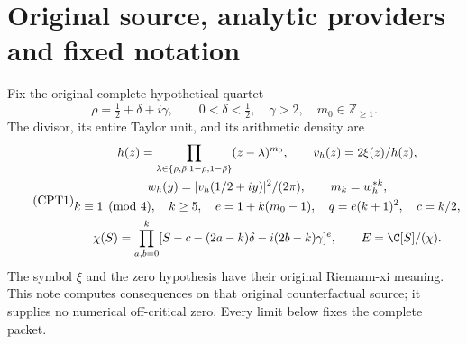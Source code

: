 \documentclass[11pt,a4paper]{article}
\begin{document}
\begin{abstract}
The full two-parameter arithmetic source interpolation has a uniformly
small central derivative on every specified complete annihilator
polynomial space.  Its explicit derivative bound is the product of the
original logarithmic density contrast and the central localization
fraction.  Integrating this derivative proves exponential relative
metric bounds and an explicit bound for the actual minimum sections.
For the complete relation ideal this gives a finite central-leg error
and a finite rectangle error in the original four-endpoint signed
determinant.  The remaining source-band interaction is expressed by its
exact two-variable reproducing-kernel integral.  Every statement retains
the full primary orders, original physical coordinate, original
polynomial remainder map, complete real integration domain and both
endpoint multiplicities.
\end{abstract}

\section{Original source, analytic providers and fixed notation}

Fix the original complete hypothetical quartet
\[
 \rho=\tfrac12+\delta+i\gamma,\qquad
 0<\delta<\tfrac12,\quad\gamma>2,\quad m_0\in\mathbb Z_{\ge1}.
\]
The divisor, its entire Taylor unit, and its arithmetic density are
\begin{equation}\tag{CPT1}
\begin{gathered}
 h(z)=\prod_{\lambda\in\{\rho,\bar\rho,1-\rho,1-\bar\rho\}}
             (z-\lambda)^{m_0},\qquad
 v_h(z)=2\xi(z)/h(z),\\
 w_h(y)=|v_h(1/2+iy)|^2/(2\pi),\qquad m_k=w_h^{*k},\\
 k\equiv1\pmod4,\quad k\ge5,\quad
 e=1+k(m_0-1),\quad q=e(k+1)^2,\quad c=k/2,\\
 \chi(S)=\prod_{a,b=0}^k
  [S-c-(2a-k)\delta-i(2b-k)\gamma]^e,\qquad
 E=\C[S]/(\chi).
\end{gathered}
\end{equation}
The symbol \(\xi\) and the zero hypothesis have their original
Riemann-xi meaning.  This note computes consequences on that original
counterfactual source; it supplies no numerical off-critical zero.
Every limit below fixes the complete packet.
\end{document}
